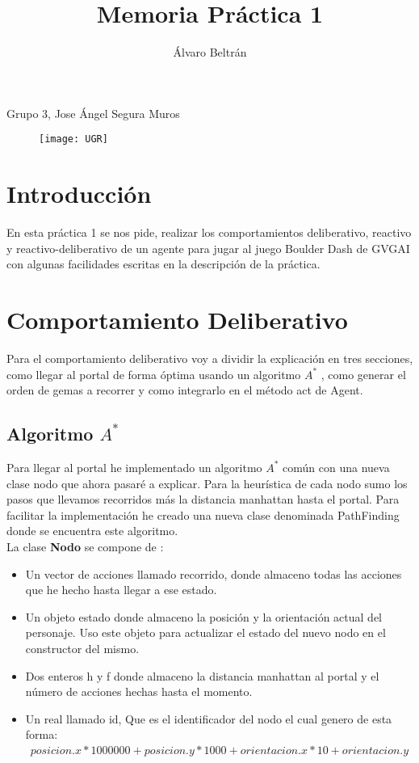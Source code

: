 \documentclass[a4paper,11pt]{article}
\title{Memoria Práctica 1}
\author{Álvaro Beltrán}
\begin{document}
\maketitle
\begin{center}
Grupo 3, Jose Ángel Segura Muros
\end{center}

\begin{figure}[h]
\texttt{[image: UGR]}
\centering
\end{figure}

\newpage

\section{Introducción}
En esta práctica 1 se nos pide, realizar los comportamientos deliberativo, reactivo y reactivo-deliberativo de un agente para jugar al juego Boulder Dash de GVGAI con algunas facilidades escritas en la descripción de la práctica.

\section{Comportamiento Deliberativo}

Para el comportamiento deliberativo voy a dividir la explicación en tres secciones, como llegar al portal de forma óptima usando un algoritmo $A^*$ , como generar el orden de gemas a recorrer y como integrarlo en el método act de Agent.

\subsection{Algoritmo $A^*$}

Para llegar al portal he implementado un algoritmo $A^*$ común con una nueva clase nodo que ahora pasaré a explicar. Para la heurística de cada nodo sumo los pasos que llevamos recorridos más la distancia manhattan hasta el portal. Para facilitar la implementación he creado una nueva clase denominada PathFinding donde se encuentra este algoritmo.\\

La clase \textbf{Nodo} se compone de :

\begin{itemize}
\item Un vector de acciones llamado recorrido, donde almaceno todas las acciones que he hecho hasta llegar a ese estado.
\item Un objeto estado donde almaceno la posición y la orientación actual del personaje. Uso este objeto para actualizar el estado del nuevo nodo en el constructor del mismo.
\item Dos enteros h y f donde almaceno la distancia manhattan al portal y el número de acciones hechas hasta el momento.
\item Un real llamado id, Que es el identificador del nodo el cual genero de esta forma:
\begin{align*}
posicion.x*1000000+posicion.y*1000+orientacion.x*10+orientacion.y
\end{align*}
\end{itemize}
\end{document}
